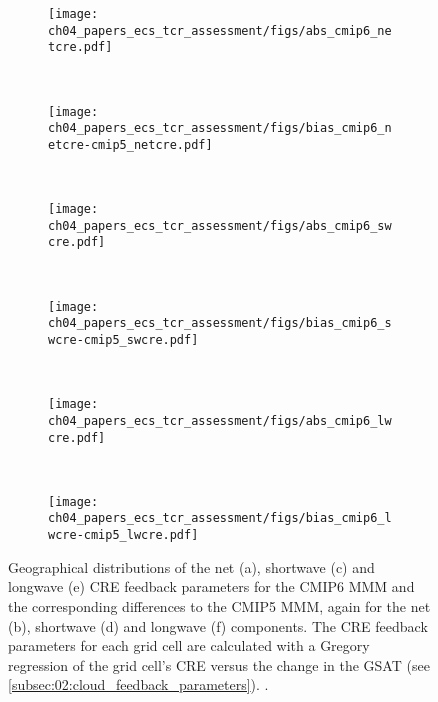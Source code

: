 \begin{figure}[p]
  \centering
  \begin{subfigure}[b]{\SubfigureWidth{}}
    \texttt{[image: 
      ch04\_papers\_ecs\_tcr\_assessment/figs/abs\_cmip6\_netcre.pdf]}
    \caption{}
    \label{fig:04:cloud_feedback_parameters:a}
  \end{subfigure}
  ~
  \begin{subfigure}[b]{\SubfigureWidth{}}
    \texttt{[image: 
      ch04\_papers\_ecs\_tcr\_assessment/figs/bias\_cmip6\_netcre-cmip5\_netcre.pdf]}
    \caption{}
    \label{fig:04:cloud_feedback_parameters:b}
  \end{subfigure}
  \\
  \begin{subfigure}[b]{\SubfigureWidth{}}
    \texttt{[image: 
      ch04\_papers\_ecs\_tcr\_assessment/figs/abs\_cmip6\_swcre.pdf]}
    \caption{}
    \label{fig:04:cloud_feedback_parameters:c}
  \end{subfigure}
  ~
  \begin{subfigure}[b]{\SubfigureWidth{}}
    \texttt{[image: 
      ch04\_papers\_ecs\_tcr\_assessment/figs/bias\_cmip6\_swcre-cmip5\_swcre.pdf]}
    \caption{}
    \label{fig:04:cloud_feedback_parameters:d}
  \end{subfigure}
  \\
  \begin{subfigure}[b]{\SubfigureWidth{}}
    \texttt{[image: 
      ch04\_papers\_ecs\_tcr\_assessment/figs/abs\_cmip6\_lwcre.pdf]}
    \caption{}
    \label{fig:04:cloud_feedback_parameters:e}
  \end{subfigure}
  ~
  \begin{subfigure}[b]{\SubfigureWidth{}}
    \texttt{[image: 
      ch04\_papers\_ecs\_tcr\_assessment/figs/bias\_cmip6\_lwcre-cmip5\_lwcre.pdf]}
    \caption{}
    \label{fig:04:cloud_feedback_parameters:f}
  \end{subfigure}
  \caption{Geographical distributions of the net (a), shortwave (c) and
    longwave (e) \acf{CRE} feedback parameters for the \acs{CMIP}6 \acf{MMM}
    and the corresponding differences to the \acs{CMIP}5 \acs{MMM}, again for
    the net (b), shortwave (d) and longwave (f) components. The \acs{CRE}
    feedback parameters for each grid cell are calculated with a Gregory
    regression of the grid cell's \acs{CRE} versus the change in the
    \acl{GSAT} (see \cref{subsec:02:cloud_feedback_parameters}).
    .}
  \label{fig:04:cloud_feedback_parameters}
\end{figure}

